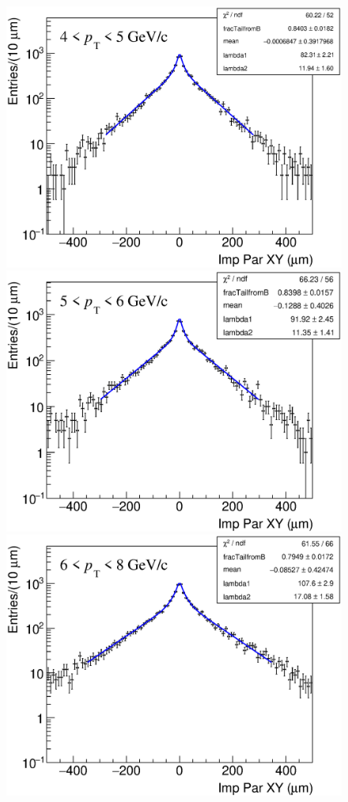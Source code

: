 \documentclass[b5paper,10pt,twoside,oldstyle,classica]{toptesi}
\begin{document}
\begin{figure}[h]
\begin{center}
{\includegraphics[scale = 0.24]{ImpParTrueFD_4-5.eps}}
\hspace{0cm}
{\includegraphics[scale = 0.24]{ImpParTrueFD_5-6.eps}}
\vspace{0cm}
{\includegraphics[scale = 0.24]{ImpParTrueFD_6-8.eps}}

\end{center}
\end{figure}
\end{document}
